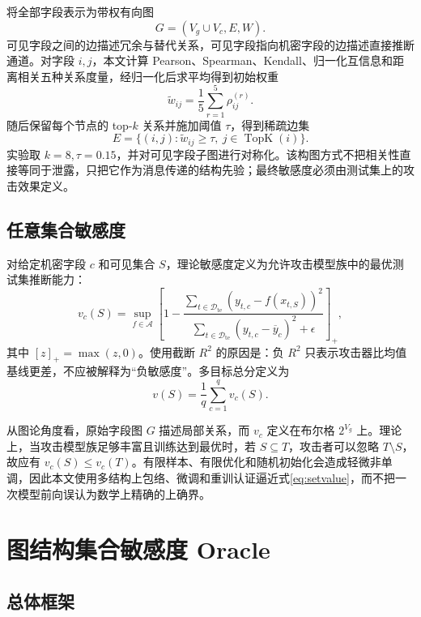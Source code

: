 \documentclass[UTF8,a4paper,zihao=5,fontset=fandol]{ctexart}
\newcommand{\Rtwo}{R^2}
\begin{document}
将全部字段表示为带权有向图
\begin{equation}
  G=(V_g\cup V_c,E,W).
\end{equation}
可见字段之间的边描述冗余与替代关系，可见字段指向机密字段的边描述直接推断通道。对字段 $i,j$，本文计算 Pearson、Spearman、Kendall、归一化互信息和距离相关五种关系度量，经归一化后求平均得到初始权重
\begin{equation}
  \widetilde w_{ij}=\frac{1}{5}\sum_{r=1}^{5}\rho^{(r)}_{ij}.
\end{equation}
随后保留每个节点的 top-$k$ 关系并施加阈值 $\tau$，得到稀疏边集
\begin{equation}
  E=\{(i,j):\widetilde w_{ij}\ge \tau,\ j\in\operatorname{TopK}(i)\}.
\end{equation}
实验取 $k=8,\tau=0.15$，并对可见字段子图进行对称化。该构图方式不把相关性直接等同于泄露，只把它作为消息传递的结构先验；最终敏感度必须由测试集上的攻击效果定义。

\subsection{任意集合敏感度}

对给定机密字段 $c$ 和可见集合 $S$，理论敏感度定义为允许攻击模型族中的最优测试集推断能力：
\begin{equation}
  v_c(S)=\sup_{f\in\mathcal A}
  \left[
  1-\frac{\sum_{t\in\mathcal D_{\mathrm{te}}}
  (y_{t,c}-f(x_{t,S}))^2}
  {\sum_{t\in\mathcal D_{\mathrm{te}}}
  (y_{t,c}-\overline y_c)^2+\epsilon}
  \right]_+,
  \label{eq:setvalue}
\end{equation}
其中 $[z]_+=\max(z,0)$。使用截断 $\Rtwo$ 的原因是：负 $\Rtwo$ 只表示攻击器比均值基线更差，不应被解释为“负敏感度”。多目标总分定义为
\begin{equation}
  v(S)=\frac{1}{q}\sum_{c=1}^{q}v_c(S).
\end{equation}

从图论角度看，原始字段图 $G$ 描述局部关系，而 $v_c$ 定义在布尔格 $2^{V_g}$ 上。理论上，当攻击模型族足够丰富且训练达到最优时，若 $S\subseteq T$，攻击者可以忽略 $T\setminus S$，故应有 $v_c(S)\le v_c(T)$。有限样本、有限优化和随机初始化会造成轻微非单调，因此本文使用多结构上包络、微调和重训认证逼近式\eqref{eq:setvalue}，而不把一次模型前向误认为数学上精确的上确界。

\section{图结构集合敏感度 Oracle}

\subsection{总体框架}
\end{document}
